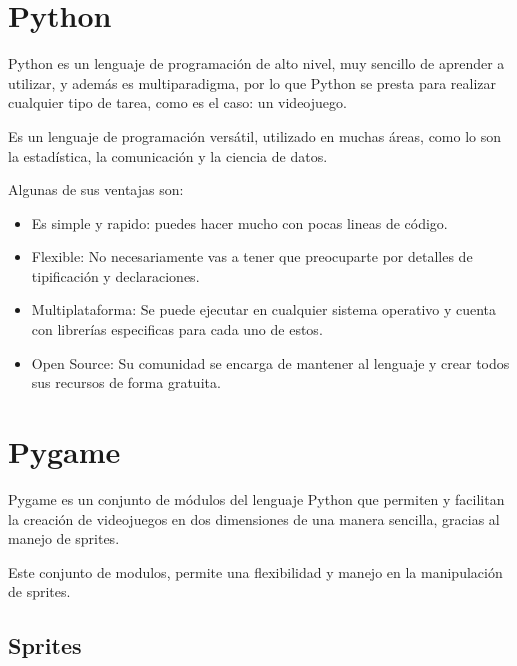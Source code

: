 \documentclass[12pt,letterpaper]{report}
\begin{document}
\section{Python\cite{Python}} 

Python es un lenguaje de programación de alto nivel, muy sencillo de aprender a utilizar, y además es multiparadigma, por lo que Python se presta para realizar cualquier tipo de tarea, como es el caso: un videojuego.

Es un lenguaje de programación versátil, utilizado en muchas áreas, como lo son la estadística, la comunicación y la ciencia de datos. 

Algunas de sus ventajas son:

\begin{itemize}

\item Es simple y rapido: puedes hacer mucho con pocas lineas de código.

\item Flexible: No necesariamente vas a tener que preocuparte por detalles de tipificación y declaraciones.

\item Multiplataforma: Se puede ejecutar en cualquier sistema operativo y cuenta con librerías especificas para cada uno de estos.

\item Open Source: Su comunidad se encarga de mantener al lenguaje y crear todos sus recursos de forma gratuita.


\end{itemize}



\section{Pygame\cite{Pygame}} 

Pygame es un conjunto de módulos del lenguaje Python que permiten y facilitan la creación de videojuegos en dos dimensiones de una manera sencilla, gracias al manejo de sprites.

Este conjunto de modulos, permite una flexibilidad y manejo en la manipulación de sprites.

\subsection{Sprites}
\end{document}
